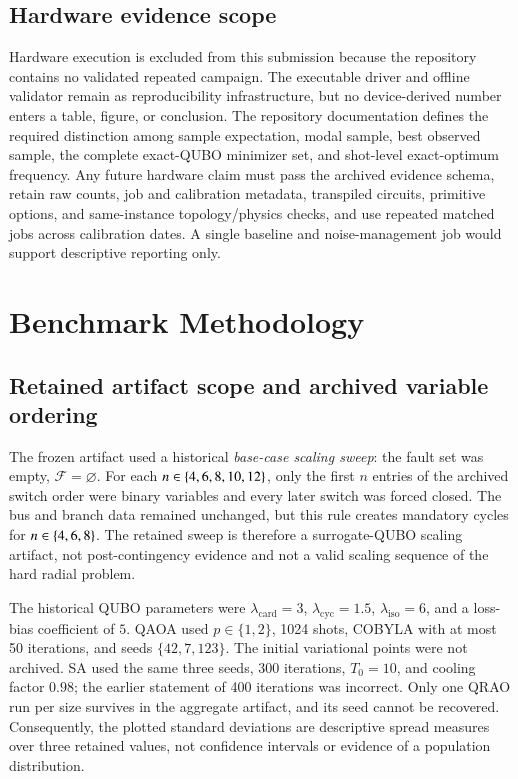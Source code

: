 \documentclass[5p,twocolumn,number,sort&compress,nopreprintline]{elsarticle}
\begin{document}
\subsection{Hardware evidence scope}
\label{sec:hardware-contract}
Hardware execution is excluded from this submission because the
repository contains no validated repeated campaign. The executable
driver and offline validator remain as reproducibility infrastructure,
but no device-derived number enters a table, figure, or conclusion.
The repository documentation defines the required distinction among
sample expectation, modal sample, best observed sample, the complete
exact-QUBO minimizer set, and shot-level exact-optimum frequency. Any
future hardware claim must pass the archived evidence schema, retain raw
counts, job and calibration metadata, transpiled circuits, primitive
options, and same-instance topology/physics checks, and use repeated
matched jobs across calibration dates. A single baseline and
noise-management job would support descriptive reporting only.

\section{Benchmark Methodology}
\label{sec:benchmark}

\subsection{Retained artifact scope and archived variable ordering}
The frozen artifact used a historical \emph{base-case scaling sweep}:
the fault set was empty, $\mathcal F=\varnothing$. For each
$n\in\{4,6,8,10,12\}$, only the first $n$ entries of the archived
switch order were binary variables and every later switch was forced
closed. The bus and branch data remained unchanged, but this rule creates
mandatory cycles for $n\in\{4,6,8\}$. The retained sweep
is therefore a surrogate-QUBO scaling artifact, not post-contingency
evidence and not a valid scaling sequence of the hard radial problem.

The historical QUBO parameters were
$\lambda_{\mathrm{card}}=3$,
$\lambda_{\mathrm{cyc}}=1.5$,
$\lambda_{\mathrm{iso}}=6$, and a loss-bias coefficient of $5$.
QAOA used $p\in\{1,2\}$, 1024 shots, COBYLA with at most 50 iterations,
and seeds $\{42,7,123\}$. The initial variational points were not
archived. SA used the same three seeds, 300 iterations, $T_0=10$, and
cooling factor $0.98$; the earlier statement of 400 iterations was
incorrect. Only one QRAO run per size survives in the aggregate artifact,
and its seed cannot be recovered. Consequently, the plotted standard
deviations are descriptive spread measures over three retained values,
not confidence intervals or evidence of a population distribution.
\end{document}

